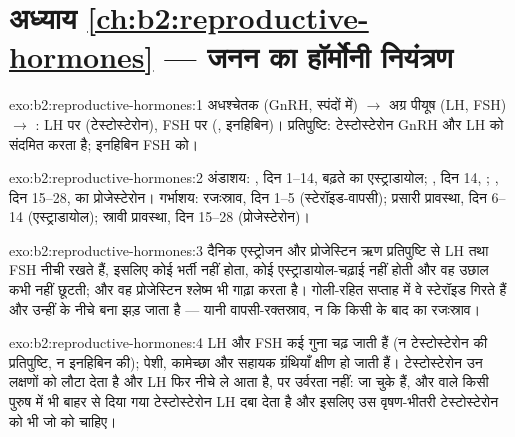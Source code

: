 \section*{अध्याय \ref{ch:b2:reproductive-hormones} --- जनन का हॉर्मोनी नियंत्रण}

\begin{solution}{exo:b2:reproductive-hormones:1}
अधश्चेतक (GnRH, स्पंदों में) $\to$ अग्र पीयूष (LH, FSH) $\to$
: LH  पर (टेस्टोस्टेरोन), FSH  पर
(, इनहिबिन)। प्रतिपुष्टि: टेस्टोस्टेरोन GnRH और
LH को संदमित करता है; इनहिबिन FSH को।
\end{solution}

\begin{solution}{exo:b2:reproductive-hormones:2}
अंडाशय: , दिन 1--14, बढ़ते  का एस्ट्राडायोल;
, दिन 14, ; , दिन 15--28,
 का प्रोजेस्टेरोन। गर्भाशय: रजःस्राव, दिन 1--5
(स्टेरॉइड-वापसी); प्रसारी प्रावस्था, दिन 6--14 (एस्ट्राडायोल);
स्रावी प्रावस्था, दिन 15--28 (प्रोजेस्टेरोन)।
\end{solution}

\begin{solution}{exo:b2:reproductive-hormones:3}
दैनिक एस्ट्रोजन और प्रोजेस्टिन ऋण प्रतिपुष्टि से LH तथा FSH नीची रखते
हैं, इसलिए कोई  भर्ती नहीं होता, कोई एस्ट्राडायोल-चढ़ाई नहीं होती और
वह उछाल कभी नहीं छूटती; और वह प्रोजेस्टिन श्लेष्म भी गाढ़ा करता है।
गोली-रहित सप्ताह में वे स्टेरॉइड गिरते हैं और उन्हीं के नीचे बना
 झड़ जाता है --- यानी वापसी-रक्तस्राव, न कि किसी
 के बाद का रजःस्राव।
\end{solution}

\begin{solution}{exo:b2:reproductive-hormones:4}
LH और FSH कई गुना चढ़ जाती हैं (न टेस्टोस्टेरोन की प्रतिपुष्टि, न
इनहिबिन की); पेशी, कामेच्छा और सहायक ग्रंथियाँ क्षीण हो जाती हैं।
टेस्टोस्टेरोन उन लक्षणों को लौटा देता है और LH फिर नीचे ले आता है, पर
उर्वरता नहीं:  जा चुके हैं, और  वाले किसी पुरुष में भी बाहर से
दिया गया टेस्टोस्टेरोन LH दबा देता है और इसलिए उस वृषण-भीतरी
टेस्टोस्टेरोन को भी जो  को चाहिए।
\end{solution}


